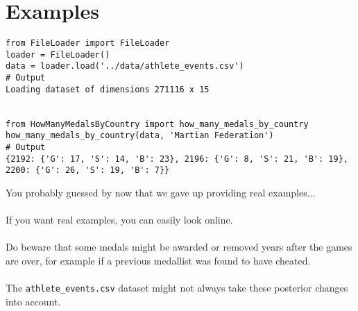 \section*{Examples}
\begin{verbatim}
from FileLoader import FileLoader
loader = FileLoader()
data = loader.load('../data/athlete_events.csv')
# Output
Loading dataset of dimensions 271116 x 15


from HowManyMedalsByCountry import how_many_medals_by_country
how_many_medals_by_country(data, 'Martian Federation')
# Output
{2192: {'G': 17, 'S': 14, 'B': 23}, 2196: {'G': 8, 'S': 21, 'B': 19}, 2200: {'G': 26, 'S': 19, 'B': 7}}
\end{verbatim}
\newline
You probably guessed by now that we gave up providing real examples...\\
\\
If you want real examples, you can easily look online.\\
\\
Do beware that some medals might be awarded or removed years after the games
are over, for example if a previous medallist was found to have cheated.\\
\\
The \texttt{athlete\_events.csv} dataset might not always take these posterior
changes into account.
